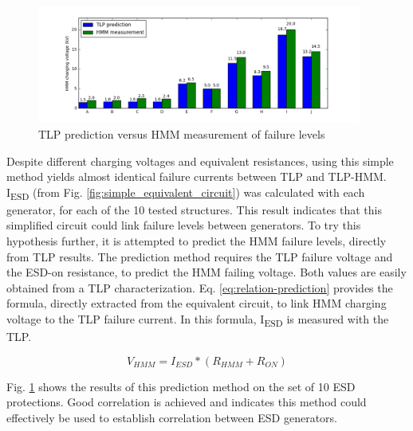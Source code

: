 \begin{figure}[!h]
  \centering
  \includegraphics[width=0.95\textwidth]{src/5/figures/correlation_results.png}
  \caption{TLP prediction versus HMM measurement of failure levels}
  \label{fig:predicted_vs_measured_levels}
\end{figure}

Despite different charging voltages and equivalent resistances, using this simple method yields almost identical failure currents between TLP and TLP-HMM.
I\textsubscript{ESD} (from Fig. \ref{fig:simple_equivalent_circuit}) was calculated with each generator, for each of the 10 tested structures.
This result indicates that this simplified circuit could link failure levels between generators.
To try this hypothesis further, it is attempted to predict the HMM failure levels, directly from TLP results.
The prediction method requires the TLP failure voltage and the ESD-on resistance, to predict the HMM failing voltage.
Both values are easily obtained from a TLP characterization.
Eq. \ref{eq:relation-prediction} provides the formula, directly extracted from the equivalent circuit, to link HMM charging voltage to the TLP failure current.
In this formula, I\textsubscript{ESD} is measured with the TLP.

\begin{equation}
V_{HMM} = I_{ESD} * (R_{HMM} + R_{ON})
\label{eq:relation-prediction}
\end{equation}

Fig. \ref{fig:predicted_vs_measured_levels} shows the results of this prediction method on the set of 10 ESD protections.
Good correlation is achieved and indicates this method could effectively be used to establish correlation between ESD generators.
